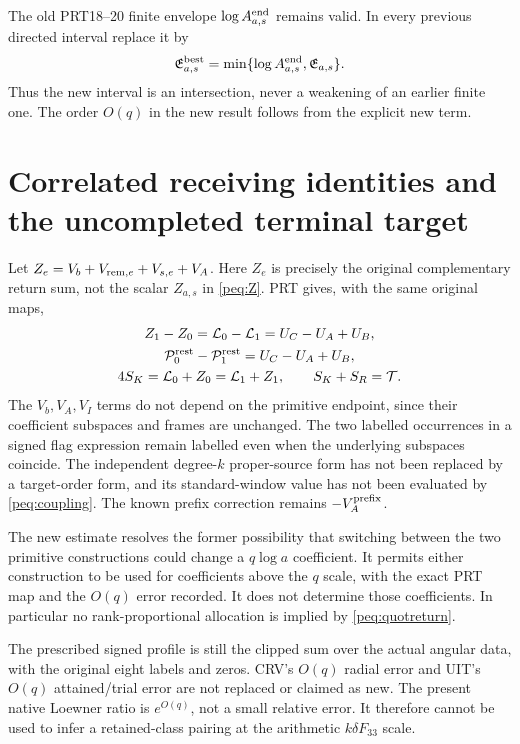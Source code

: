 \documentclass[11pt,a4paper]{article}
\begin{document}
The old PRT18--20 finite envelope $\log A^{\rm end}_{a,s}$ remains valid. In every previous directed interval replace it by
\begin{equation}
 \mathfrak E^{\rm best}_{a,s}
 =\min\{\log A^{\rm end}_{a,s},\mathfrak E_{a,s}\}.
 \label{peq:intersection}
\end{equation}
Thus the new interval is an intersection, never a weakening of an earlier finite one. The order $O(q)$ in the new result follows from the explicit new term.

\section{Correlated receiving identities and the uncompleted terminal target}
Let $Z_e=V_b+V_{{\rm rem},e}+V_{s,e}+V_A$. Here $Z_e$ is precisely the original complementary return sum, not the scalar $Z_{a,s}$ in \eqref{peq:Z}. PRT gives, with the same original maps,
\begin{equation}
\begin{gathered}
 Z_1-Z_0=\mathcal L_0-\mathcal L_1=U_C-U_A+U_B,\\
 \mathcal P^{\rm rest}_0-\mathcal P^{\rm rest}_1=U_C-U_A+U_B,\\
 4S_K=\mathcal L_0+Z_0=\mathcal L_1+Z_1,\qquad
 S_K+S_R=\mathcal T.
\end{gathered}\label{peq:coupling}
\end{equation}
The $V_b,V_A,V_I$ terms do not depend on the primitive endpoint, since their coefficient subspaces and frames are unchanged. The two labelled occurrences in a signed flag expression remain labelled even when the underlying subspaces coincide. The independent degree-$k$ proper-source form has not been replaced by a target-order form, and its standard-window value has not been evaluated by \eqref{peq:coupling}. The known prefix correction remains $-V_A^{\rm prefix}$.

The new estimate resolves the former possibility that switching between the two primitive constructions could change a $q\log a$ coefficient. It permits either construction to be used for coefficients above the $q$ scale, with the exact PRT map and the $O(q)$ error recorded. It does not determine those coefficients. In particular no rank-proportional allocation is implied by \eqref{peq:quotreturn}.

The prescribed signed profile is still the clipped sum over the actual angular data, with the original eight labels and zeros. CRV's $O(q)$ radial error and UIT's $O(q)$ attained/trial error are not replaced or claimed as new. The present native Loewner ratio is $e^{O(q)}$, not a small relative error. It therefore cannot be used to infer a retained-class pairing at the arithmetic $k\delta F_{33}$ scale.
\end{document}
